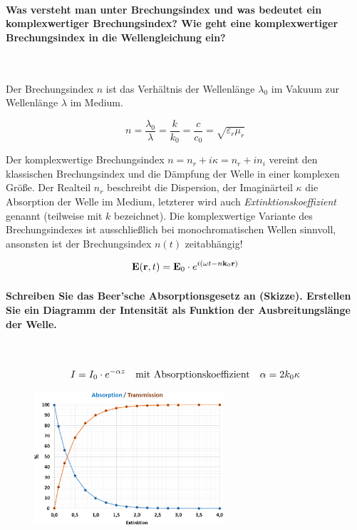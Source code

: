 \documentclass[a4paper, 11pt, ngerman, parskip=half-]{scrartcl}
\begin{document}
\paragraph{Was versteht man unter Brechungsindex und was bedeutet ein komplexwertiger
    Brechungsindex? Wie geht eine komplexwertiger Brechungsindex in die Wellengleichung ein?} ~

Der Brechungsindex $n$ ist das Verhältnis der Wellenlänge $\lambda_0$ im Vakuum zur Wellenlänge
$\lambda$ im Medium.

\begin{equation}
	n = \frac{\lambda_0}{\lambda} = \frac{k}{k_0} = \frac{c}{c_0} = \sqrt{\varepsilon_r \mu_r}
\end{equation}

Der komplexwertige Brechungsindex $n = n_r + i \kappa = n_r + i n_i$ vereint den klassischen
Brechungsindex und die Dämpfung der Welle in einer komplexen Größe. Der Realteil $n_r$ beschreibt die
Dispersion, der Imaginärteil $\kappa$ die Absorption der Welle im Medium, letzterer wird auch \textit{Extinktionskoeffizient}
genannt (teilweise mit $k$ bezeichnet). Die komplexwertige Variante des Brechungsindexes ist ausschließlich bei
monochromatischen Wellen sinnvoll, ansonsten ist der Brechungsindex $n(t)$ zeitabhängig!

\begin{equation}
    \vb{E}(\vb{r},t) = \vb{E}_0 \cdot e^{i(\omega t - n \vb{k}_0 \vb{r})}
\end{equation}

\paragraph{Schreiben Sie das Beer'sche Absorptionsgesetz an (Skizze). Erstellen Sie ein Diagramm der
    Intensität als Funktion der Ausbreitungslänge der Welle.} ~

\begin{equation}
    I = I_0 \cdot e^{- \alpha z} \qq{mit Absorptionskoeffizient} \alpha = 2 k_0 \kappa
\end{equation}

\begin{figure}[H]
    \centering
    \includegraphics[width=7cm]{image/14/5}
\end{figure}
\end{document}
